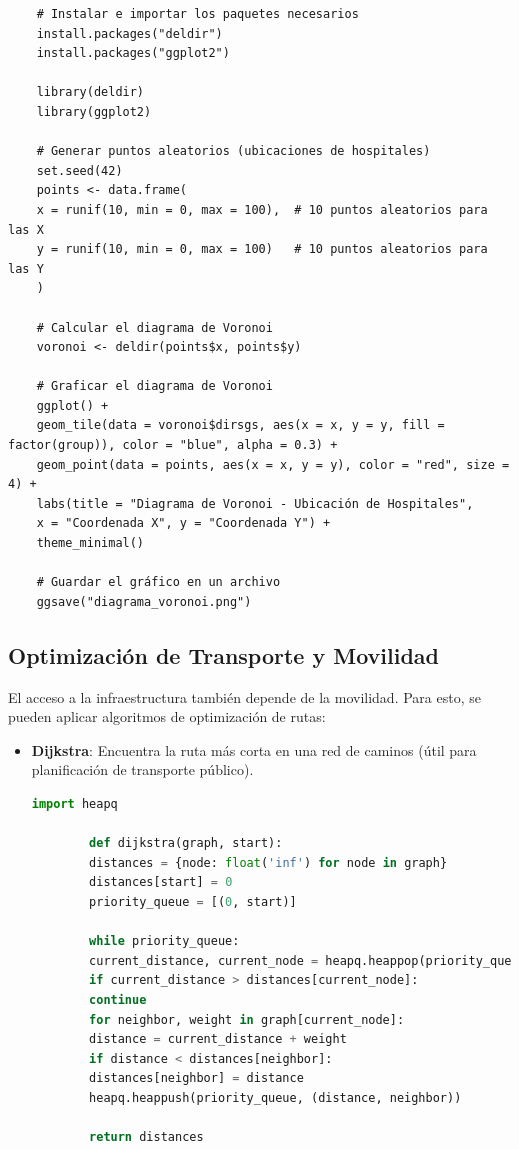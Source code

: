 \documentclass{article}
\begin{document}
{\begin{lstlisting}
	# Instalar e importar los paquetes necesarios
	install.packages("deldir")
	install.packages("ggplot2")
	
	library(deldir)
	library(ggplot2)
	
	# Generar puntos aleatorios (ubicaciones de hospitales)
	set.seed(42)
	points <- data.frame(
	x = runif(10, min = 0, max = 100),  # 10 puntos aleatorios para las X
	y = runif(10, min = 0, max = 100)   # 10 puntos aleatorios para las Y
	)
	
	# Calcular el diagrama de Voronoi
	voronoi <- deldir(points$x, points$y)
	
	# Graficar el diagrama de Voronoi
	ggplot() +
	geom_tile(data = voronoi$dirsgs, aes(x = x, y = y, fill = factor(group)), color = "blue", alpha = 0.3) +
	geom_point(data = points, aes(x = x, y = y), color = "red", size = 4) +
	labs(title = "Diagrama de Voronoi - Ubicación de Hospitales", 
	x = "Coordenada X", y = "Coordenada Y") +
	theme_minimal()
	
	# Guardar el gráfico en un archivo
	ggsave("diagrama_voronoi.png")
\end{lstlisting}

\subsection*{Optimización de Transporte y Movilidad}
El acceso a la infraestructura también depende de la movilidad. Para esto, se pueden aplicar algoritmos de optimización de rutas:

\begin{itemize}
	\item \textbf{Dijkstra}: Encuentra la ruta más corta en una red de caminos (útil para planificación de transporte público).
	\begin{lstlisting}[language=Python]
		import heapq
		
		def dijkstra(graph, start):
		distances = {node: float('inf') for node in graph}
		distances[start] = 0
		priority_queue = [(0, start)]
		
		while priority_queue:
		current_distance, current_node = heapq.heappop(priority_queue)
		if current_distance > distances[current_node]:
		continue
		for neighbor, weight in graph[current_node]:
		distance = current_distance + weight
		if distance < distances[neighbor]:
		distances[neighbor] = distance
		heapq.heappush(priority_queue, (distance, neighbor))
		
		return distances
		

\end{lstlisting}
\end{itemize}}
\end{document}
